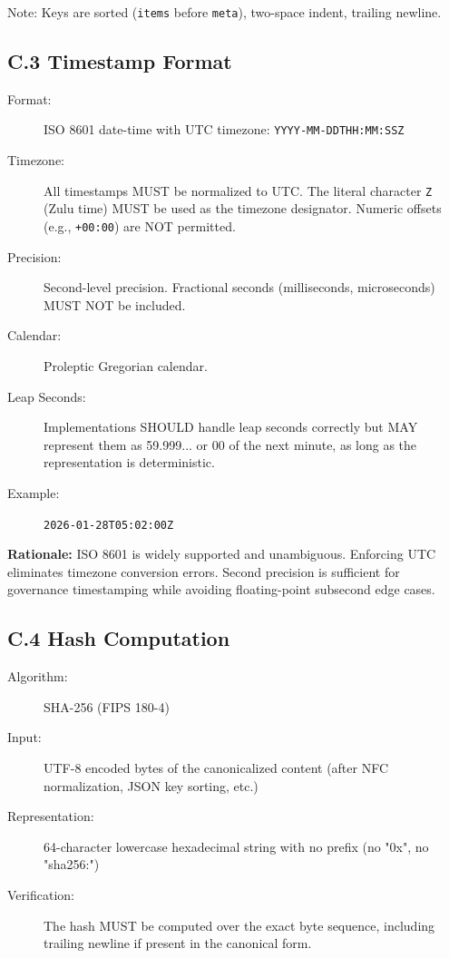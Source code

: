 \documentclass[11pt,a4paper]{article}
\begin{document}
Note: Keys are sorted (\texttt{items} before \texttt{meta}), two-space indent, trailing newline.

\subsection*{C.3 Timestamp Format}

\begin{description}
\item[Format:] ISO 8601 date-time with UTC timezone: \texttt{YYYY-MM-DDTHH:MM:SSZ}

\item[Timezone:] All timestamps MUST be normalized to UTC. The literal character \texttt{Z} (Zulu time) MUST be used as the timezone designator. Numeric offsets (e.g., \texttt{+00:00}) are NOT permitted.

\item[Precision:] Second-level precision. Fractional seconds (milliseconds, microseconds) MUST NOT be included.

\item[Calendar:] Proleptic Gregorian calendar.

\item[Leap Seconds:] Implementations SHOULD handle leap seconds correctly but MAY represent them as 59.999... or 00 of the next minute, as long as the representation is deterministic.

\item[Example:] \texttt{2026-01-28T05:02:00Z}
\end{description}

\textbf{Rationale:} ISO 8601 is widely supported and unambiguous. Enforcing UTC eliminates timezone conversion errors. Second precision is sufficient for governance timestamping while avoiding floating-point subsecond edge cases.

\subsection*{C.4 Hash Computation}

\begin{description}
\item[Algorithm:] SHA-256 (FIPS 180-4)

\item[Input:] UTF-8 encoded bytes of the canonicalized content (after NFC normalization, JSON key sorting, etc.)

\item[Representation:] 64-character lowercase hexadecimal string with no prefix (no "0x", no "sha256:")

\item[Verification:] The hash MUST be computed over the exact byte sequence, including trailing newline if present in the canonical form.
\end{description}
\end{document}
